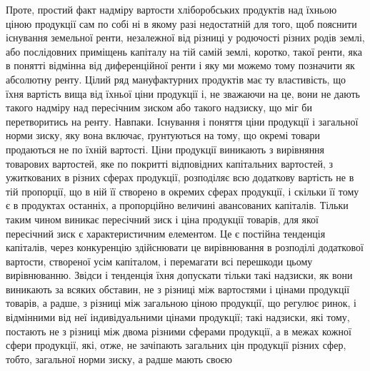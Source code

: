       Проте, простий факт надміру вартости хліборобських продуктів над їхньою ціною продукції сам по
собі ні в якому разі недостатній для того, щоб пояснити існування земельної ренти, незалежної від
різниці у родючості різних родів землі, або послідовних приміщень капіталу на тій самій землі,
коротко, такої ренти, яка в понятті відмінна від диференційної ренти і яку ми можемо тому позначити
як абсолютну ренту. Цілий ряд мануфактурних продуктів має ту властивість, що їхня вартість вища від
їхньої ціни продукції і, не зважаючи на це, вони не дають такого надміру над пересічним зиском або
такого надзиску, що міг би перетворитись на ренту. Навпаки. Існування і поняття ціни продукції і
загальної норми зиску, яку вона включає, ґрунтуються на тому, що окремі товари продаються не по
їхній вартості. Ціни продукції виникають з вирівняння товарових вартостей, яке по покритті
відповідних капітальних вартостей, з ужиткованих в різних сферах продукції, розподіляє всю додаткову
вартість не в тій пропорції, що в ній її створено в окремих сферах продукції, і скільки її тому є в
продуктах останніх, а пропорційно величині авансованих капіталів. Тільки таким чином виникає
пересічний зиск і ціна продукції товарів, для якої пересічний зиск є характеристичним елементом. Це
є постійна тенденція капіталів, через конкуренцію здійснювати це вирівнювання в розподілі додаткової
вартости, створеної усім капіталом, і перемагати всі перешкоди цьому
вирівнюванню. Звідси і тенденція їхня допускати тільки такі надзиски, як вони виникають за всяких
обставин, не з різниці між вартостями і цінами продукції товарів, а радше, з різниці між загальною
ціною продукції, що регулює ринок, і відмінними від неї індивідуальними цінами продукції; такі
надзиски, які тому, постають не з різниці між двома різними сферами продукції, а в межах кожної
сфери продукції, які, отже, не зачіпають загальних цін продукції різних сфер, тобто, загальної норми
зиску, а радше мають своєю
\parbreak{}  %
